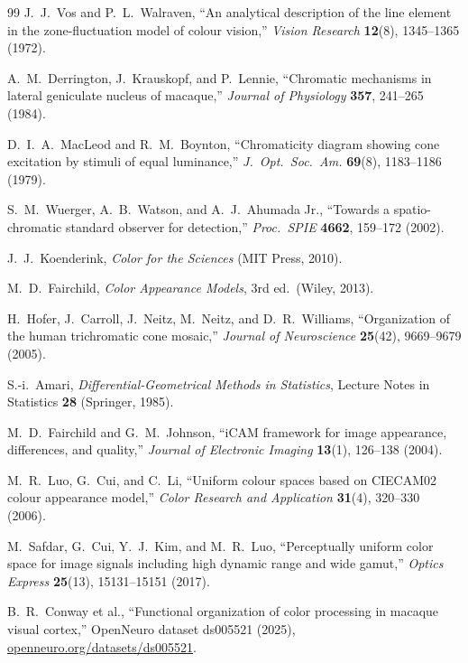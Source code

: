 \documentclass[12pt,a4paper]{article}
\begin{document}
\begin{thebibliography}{99}
J.~J.~Vos and P.~L.~Walraven,
``An analytical description of the line element in the
zone-fluctuation model of colour vision,''
\textit{Vision Research} \textbf{12}(8), 1345--1365 (1972).

A.~M.~Derrington, J.~Krauskopf, and P.~Lennie,
``Chromatic mechanisms in lateral geniculate nucleus of macaque,''
\textit{Journal of Physiology} \textbf{357}, 241--265 (1984).

D.~I.~A.~MacLeod and R.~M.~Boynton,
``Chromaticity diagram showing cone excitation by stimuli of equal
luminance,''
\textit{J.~Opt.~Soc.~Am.} \textbf{69}(8), 1183--1186 (1979).

S.~M.~Wuerger, A.~B.~Watson, and A.~J.~Ahumada Jr.,
``Towards a spatio-chromatic standard observer for detection,''
\textit{Proc.\ SPIE} \textbf{4662}, 159--172 (2002).

J.~J.~Koenderink,
\textit{Color for the Sciences} (MIT Press, 2010).

M.~D.~Fairchild,
\textit{Color Appearance Models}, 3rd ed.\ (Wiley, 2013).

H.~Hofer, J.~Carroll, J.~Neitz, M.~Neitz, and D.~R.~Williams,
``Organization of the human trichromatic cone mosaic,''
\textit{Journal of Neuroscience} \textbf{25}(42), 9669--9679 (2005).

S.-i.\ Amari,
\textit{Differential-Geometrical Methods in Statistics},
Lecture Notes in Statistics \textbf{28} (Springer, 1985).

M.~D.~Fairchild and G.~M.~Johnson,
``iCAM framework for image appearance, differences, and quality,''
\textit{Journal of Electronic Imaging} \textbf{13}(1), 126--138 (2004).

M.~R.~Luo, G.~Cui, and C.~Li,
``Uniform colour spaces based on CIECAM02 colour appearance model,''
\textit{Color Research and Application} \textbf{31}(4), 320--330 (2006).

M.~Safdar, G.~Cui, Y.~J.~Kim, and M.~R.~Luo,
``Perceptually uniform color space for image signals including high
dynamic range and wide gamut,''
\textit{Optics Express} \textbf{25}(13), 15131--15151 (2017).

B.~R.~Conway et al.,
``Functional organization of color processing in macaque visual
cortex,''
OpenNeuro dataset ds005521 (2025),
\href{https://openneuro.org/datasets/ds005521}{openneuro.org/datasets/ds005521}.

\end{thebibliography}
\end{document}
